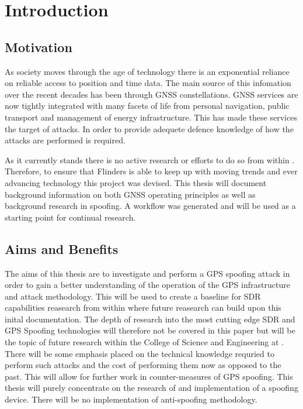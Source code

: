 
\chapter{Introduction}\label{chapter:firstchapter} %

\label{Chapter1} %

\section{Motivation}\label{sec:Motivation}


As society moves through the age of technology there is an exponential reliance on reliable access to position and time data. The main source of this infomation over the
recent decades has been through GNSS constellations. GNSS services are now tightly integrated with many facets of life from personal navigation, public transport and
management of energy infrastructure. This has made these services the target of attacks. In order to provide adequete defence knowledge of how the attacks are performed is
required.

As it currently stands there is no active research or efforts to do so from within \univname. Therefore, to ensure that Flinders is able to keep up with moving trends and
ever advancing technology this project was devised. This thesis will document background information on both GNSS operating principles as well as background research in
spoofing. A workflow was generated and will be used as a starting point for continual research.

\section{Aims and Benefits}\label{sec:Aims}
The aims of this thesis are to investigate and perform a GPS spoofing attack in order to gain a better understanding of the operation of the GPS infrastructure and attack
methodology. This will be used to create a baseline for SDR capabilities reasearch from within \univname where future reasearch can build upon this inital documentation.
The depth of research into the most cutting edge SDR and GPS Spoofing technologies will therefore not be covered in this paper but will be the topic of future research
within the College of Science and Engineering at \univname.
There will be some emphasis placed on the technical knowledge requried to perform such attacks and the cost of performing them now as opposed to the past. This will
allow for further work in counter-measures of GPS spoofing.
This thesis will purely concentrate on the research of and implementation of a spoofing device. There will be no implementation of anti-spoofing methodology.

